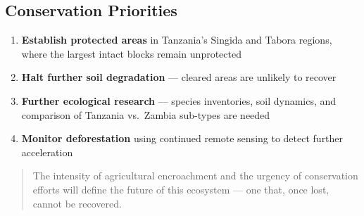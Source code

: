 \documentclass[
  11pt,
  a4paper,
  DIV=11,
  numbers=noendperiod]{scrartcl}
\providecommand{\tightlist}{%
  \setlength{\itemsep}{0pt}\setlength{\parskip}{0pt}}\usepackage{longtable,booktabs,array}
\begin{document}
\subsection{Conservation Priorities}\label{conservation-priorities}

\begin{enumerate}
\def\labelenumi{\arabic{enumi}.}
\tightlist
\item
  \textbf{Establish protected areas} in Tanzania's Singida and Tabora
  regions, where the largest intact blocks remain unprotected
\item
  \textbf{Halt further soil degradation} --- cleared areas are unlikely
  to recover
\item
  \textbf{Further ecological research} --- species inventories, soil
  dynamics, and comparison of Tanzania vs.~Zambia sub-types are needed
\item
  \textbf{Monitor deforestation} using continued remote sensing to
  detect further acceleration
\end{enumerate}

\begin{quote}
The intensity of agricultural encroachment and the urgency of
conservation efforts will define the future of this ecosystem --- one
that, once lost, cannot be recovered.
\end{quote}
\end{document}
